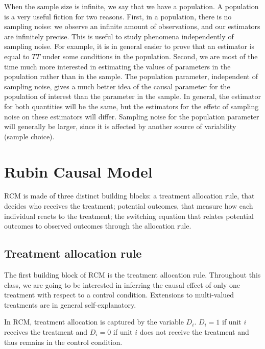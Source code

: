 \documentclass[
]{book}
\theoremstyle{definition}
\theoremstyle{definition}
\theoremstyle{definition}
\theoremstyle{definition}
\theoremstyle{remark}
\begin{document}
When the sample size is infinite, we say that we have a population.
A population is a very useful fiction for two reasons.
First, in a population, there is no sampling noise: we observe an infinite amount of observations, and our estimators are infinitely precise.
This is useful to study phenomena independently of sampling noise.
For example, it is in general easier to prove that an estimator is equal to \(TT\) under some conditions in the population.
Second, we are most of the time much more interested in estimating the values of parameters in the population rather than in the sample.
The population parameter, independent of sampling noise, gives a much better idea of the causal parameter for the population of interest than the parameter in the sample.
In general, the estimator for both quantities will be the same, but the estimators for the effetc of sampling noise on these estimators will differ.
Sampling noise for the population parameter will generally be larger, since it is affected by another source of variability (sample choice).

\hypertarget{rubin-causal-model}{%
\section{Rubin Causal Model}\label{rubin-causal-model}}

RCM is made of three distinct building blocks: a treatment allocation rule, that decides who receives the treatment; potential outcomes, that measure how each individual reacts to the treatment; the switching equation that relates potential outcomes to observed outcomes through the allocation rule.

\hypertarget{treatment-allocation-rule}{%
\subsection{Treatment allocation rule}\label{treatment-allocation-rule}}

The first building block of RCM is the treatment allocation rule.
Throughout this class, we are going to be interested in inferring the causal effect of only one treatment with respect to a control condition.
Extensions to multi-valued treatments are in general self-explanatory.

In RCM, treatment allocation is captured by the variable \(D_i\).
\(D_i=1\) if unit \(i\) receives the treatment and \(D_i=0\) if unit \(i\) does not receive the treatment and thus remains in the control condition.
\end{document}
